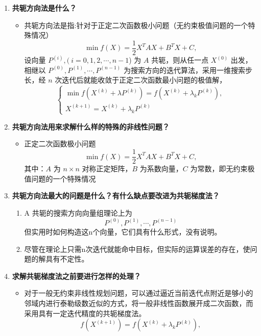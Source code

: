 \begin{enumerate}
\begin{enumerate}
		\end{enumerate}
		\item \textbf{共轭方向法是什么？}
		\begin{itemize}
			\item     共轭方向法是指:针对于正定二次函数极小问题（无约束极值问题的一个特殊情况）
			\[
			\min f(X) = \frac{1}{2} X^T A X + B^T X + C,
			\]
			设向量 $P^{(i)}, (\ i=0,1,2,\cdots,n-1$) 为 $A$ 共轭，则从任一点 $X^{(0)}$ 出发，相继以
			$
			P^{(0)}, P^{(1)}, \cdots, P^{(n-1)}
			$
			为搜索方向的迭代算法，采用一维搜索步长，经 $n$ 次迭代后就能收敛于正定二次函数最小问题的极值解，
			\[
			\begin{cases}
				\min f(X^{(k)} + \lambda P^{(k)}) = f(X^{(k)} + \lambda_k P^{(k)}), \\
				X^{(k+1)} = X^{(k)} + \lambda_k P^{(k)}
			\end{cases}
			\]
		\end{itemize}
		\item \textbf{共轭方向法用来求解什么样的特殊的非线性问题？}
		\begin{itemize}
			\item 正定二次函数极小问题    
			\[
			\min f(X) = \frac{1}{2} X^T A X + B^T X + C,
			\]
			其中：$A$ 为 $n \times n$ 对称正定矩阵，$B$ 为系数向量，$C$ 为常数，即无约束极值问题的一个特殊情况
		\end{itemize}
		\item \textbf{共轭方向法最大的问题是什么？有什么缺点要改进为共轭梯度法？}
		\begin{enumerate}
			\item A 共轭的搜索方向向量组理论上为\[
			P^{(0)}, P^{(1)}, \cdots, P^{(n-1)}
			\]
			但实用时如何构造这n个向量，它们具有什么形式，没有说明。
			\item 尽管在理论上只需n次迭代就能命中目标，但实际的运算误差的存在，使问题的解具有不定性。
		\end{enumerate}
		\item \textbf{求解共轭梯度法之前要进行怎样的处理？ }
		\begin{itemize}
			\item 对于一般无约束非线性规划问题，可以通过逼近当前迭代点附近是够小的邻域内进行泰勒级数近似的方式，将一般非线性函数展开成二次函数，而采用具有一定迭代精度的共轭梯度法。
			\[
			f(X^{(k+1)}) = f(X^{(k)} + \lambda_k P^{(k)}),
			\]


\end{itemize}
\end{enumerate}
